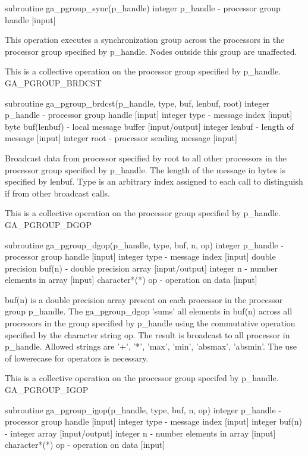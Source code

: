 subroutine ga\_pgroup\_sync(p\_handle) integer p\_handle - processor
group handle {[}input{]}

This operation executes a synchronization group across the processors
in the processor group specified by p\_handle. Nodes outside this
group are unaffected.

This is a collective operation on the processor group specified by
p\_handle. GA\_PGROUP\_BRDCST

subroutine ga\_pgroup\_brdcst(p\_handle, type, buf, lenbuf, root)
integer p\_handle - processor group handle {[}input{]} integer type
- message index {[}input{]} byte buf(lenbuf) - local message buffer
{[}input/output{]} integer lenbuf - length of message {[}input{]}
integer root - processor sending message {[}input{]}

Broadcast data from processor specified by root to all other processors
in the processor group specified by p\_handle. The length of the message
in bytes is specified by lenbuf. Type is an arbitrary index assigned
to each call to distinguish if from other broadcast calls.

This is a collective operation on the processor group specified by
p\_handle. GA\_PGROUP\_DGOP

subroutine ga\_pgroup\_dgop(p\_handle, type, buf, n, op) integer p\_handle
- processor group handle {[}input{]} integer type - message index
{[}input{]} double precision buf(n) - double precision array {[}input/output{]}
integer n - number elements in array {[}input{]} character{*}({*})
op - operation on data {[}input{]}

buf(n) is a double precision array present on each processor in the
processor group p\_handle. The ga\_pgroup\_dgop 'sums' all elements
in buf(n) across all processors in the group specified by p\_handle
using the commutative operation specified by the character string
op. The result is broadcast to all processor in p\_handle. Allowed
strings are '+', '{*}', 'max', 'min', 'absmax', 'absmin'. The use
of lowerecase for operators is necessary.

This is a collective operation on the processor group specifed by
p\_handle. GA\_PGROUP\_IGOP

subroutine ga\_pgroup\_igop(p\_handle, type, buf, n, op) integer p\_handle
- processor group handle {[}input{]} integer type - message index
{[}input{]} integer buf(n) - integer array {[}input/output{]} integer
n - number elements in array {[}input{]} character{*}({*}) op - operation
on data {[}input{]}

